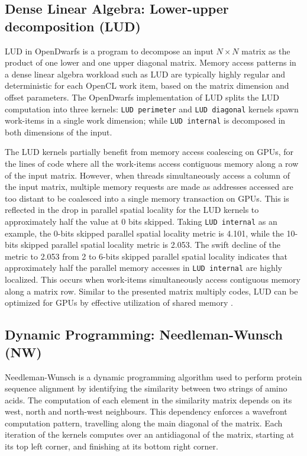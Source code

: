 \documentclass[review=false, sigchi]{acmart}
\begin{document}
	\subsection{Dense Linear Algebra: Lower-upper decomposition (LUD)}
	
	LUD in OpenDwarfs is a program to decompose an input $N\times N$ matrix as the product of one lower and one upper diagonal matrix. 
	Memory access patterns in a dense linear algebra workload such as LUD are typically highly regular and deterministic for each OpenCL work item, based on the matrix dimension and offset parameters. The OpenDwarfs implementation of LUD \cite{opendwarfs2020head} splits the LUD computation into three kernels: \texttt{LUD perimeter} and \texttt{LUD diagonal} kernels spawn work-items in a single work dimension; while \texttt{LUD internal} is decomposed in both dimensions of the input.
	
	The LUD kernels partially benefit from memory access coalescing on GPUs, for the lines of code where all the work-items access contiguous memory along a row of the input matrix. 
	However, when threads simultaneously access a column of the input matrix, multiple memory requests are made as addresses accessed are too distant to be coalesced into a single memory transaction on GPUs. 
	This is reflected in the drop in parallel spatial locality for the LUD kernels to approximately half the value at 0 bits skipped. Taking \texttt{LUD internal} as an example, the 0-bits skipped parallel spatial locality metric is 4.101, while the 10-bits skipped parallel spatial locality metric is 2.053. 
	The swift decline of the metric to 2.053 from 2 to 6-bits skipped parallel spatial locality indicates that approximately half the parallel memory accesses in \texttt{LUD internal} are highly localized. This occurs when work-items simultaneously access contiguous memory along a matrix row. 
	Similar to the presented matrix multiply codes, LUD can be optimized for GPUs by effective utilization of shared memory \cite{opendwarfs2020head}.
	
	\subsection{Dynamic Programming: Needleman-Wunsch (NW)}
	
	Needleman-Wunsch is a dynamic programming algorithm used to perform protein sequence alignment by identifying the similarity between two strings of amino acids.
	The computation of each element in the similarity matrix depends on its west, north and north-west neighbours.
	This dependency enforces a wavefront computation pattern, travelling along the main diagonal of the matrix. Each iteration of the kernels computes over an antidiagonal of the matrix, starting at its top left corner, and finishing at its bottom right corner.
	
\end{document}

